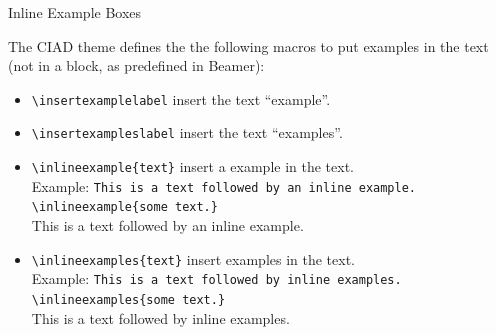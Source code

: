 \documentclass[english,sectioncirclenumberstyle]{ciadbeamer}
\begin{document}
\begin{frame}{Inline Example Boxes}
	\begin{small}
	The CIAD theme defines the the following macros to put examples in the text (not in a block, as predefined in Beamer):
	\begin{itemize}
	\item \texttt{{\textbackslash}insertexamplelabel} insert the text ``example''.
	\item \texttt{{\textbackslash}insertexampleslabel} insert the text ``examples''.
	\vspace{1em}
	\item \texttt{{\textbackslash}inlineexample\{text\}} insert a example in the text. \\
		Example: \texttt{This is a text followed by an inline example. {\textbackslash}inlineexample\{some text.\}} \\
		This is a text followed by an inline example. 
	\item \texttt{{\textbackslash}inlineexamples\{text\}} insert examples in the text. \\
		Example: \texttt{This is a text followed by inline examples. {\textbackslash}inlineexamples\{some text.\}} \\
		This is a text followed by inline examples. 
	\end{itemize}
	\end{small}
\end{frame}
\end{document}

